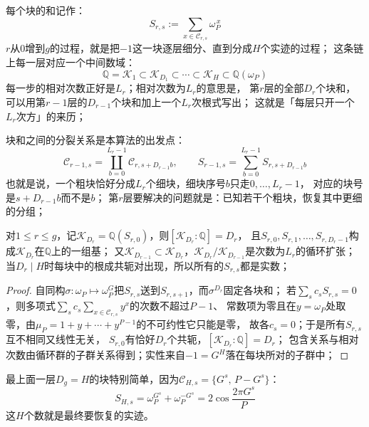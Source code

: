\documentclass[UTF8,a4paper,11pt]{ctexart}
\newcommand{\QQ}{\mathbb Q}
\begin{document}
每个块的和记作：
\[
 S_{r,s}:=\sum_{x\in\mathscr{C}_{r,s}}\omega_P^{\,x}
\]
$r$从$0$增到$g$的过程，就是把$-1$这一块逐层细分、直到分成$H$个实迹的过程；
这条链上每一层对应一个中间数域：
\[
 \QQ=\mathscr{K}_1\subset\mathscr{K}_{D_1}\subset\cdots\subset\mathscr{K}_H\subset\QQ(\omega_P)
\]
每一步的相对次数正好是$L_r$；相对次数为$L_r$的意思是，
第$r$层的全部$D_r$个块和，可以用第$r-1$层的$D_{r-1}$个块和加上一个$L_r$次根式写出；
这就是「每层只开一个$L_r$次方」的来历；\par

块和之间的分裂关系是本算法的出发点：
\[
 \mathscr{C}_{r-1,s}=\coprod_{b=0}^{L_r-1}\mathscr{C}_{r,s+D_{r-1}b},
 \qquad
 S_{r-1,s}=\sum_{b=0}^{L_r-1}S_{r,s+D_{r-1}b}
\]
也就是说，一个粗块恰好分成$L_r$个细块，细块序号$b$只走$0,\dots,L_r-1$，
对应的块号是$s+D_{r-1}b$而不是$b$；
第$r$层要解决的问题就是：已知若干个粗块，恢复其中更细的分组；\par

\begin{proposition}
对$1\le r\le g$，记$\mathscr{K}_{D_r}=\QQ(S_{r,0})$，则$[\mathscr{K}_{D_r}:\QQ]=D_r$，
且$S_{r,0},S_{r,1},\dots,S_{r,D_r-1}$构成$\mathscr{K}_{D_r}$在$\QQ$上的一组基；
又$\mathscr{K}_{D_{r-1}}\subset\mathscr{K}_{D_r}$，$\mathscr{K}_{D_r}/\mathscr{K}_{D_{r-1}}$是次数为$L_r$的循环扩张；
当$D_r\mid H$时每块中的根成共轭对出现，所以所有的$S_{r,s}$都是实数；
\end{proposition}
\begin{proof}
自同构$\sigma:\omega_P\mapsto\omega_P^{G}$把$S_{r,s}$送到$S_{r,s+1}$，而$\sigma^{D_r}$固定各块和；
若$\sum_sc_sS_{r,s}=0$，则多项式$\sum_sc_s\sum_{x\in\mathscr{C}_{r,s}}y^x$的次数不超过$P-1$、
常数项为零且在$y=\omega_P$处取零，由$\mu_P=1+y+\cdots+y^{P-1}$的不可约性它只能是零，
故各$c_s=0$；于是所有$S_{r,s}$互不相同又线性无关，
$S_{r,0}$有恰好$D_r$个共轭，$[\mathscr{K}_{D_r}:\QQ]=D_r$；
包含关系与相对次数由循环群的子群关系得到；实性来自$-1=G^{H}$落在每块所对的子群中；
\end{proof}

最上面一层$D_g=H$的块特别简单，因为$\mathscr{C}_{H,s}=\{G^s,\,P-G^s\}$：
\[
 S_{H,s}=\omega_P^{G^s}+\omega_P^{-G^s}=2\cos\frac{2\pi G^s}{P}
\]
这$H$个数就是最终要恢复的实迹。\par
\end{document}
